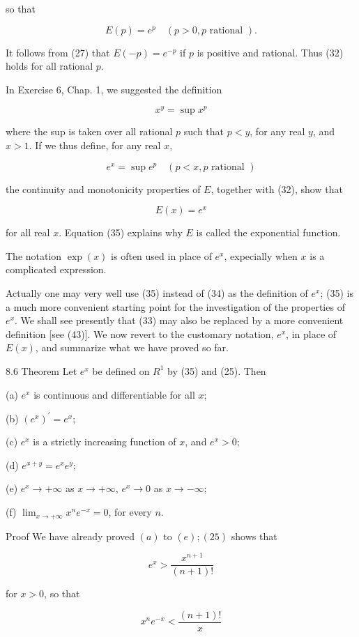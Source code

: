 \documentclass[10pt]{article}
\begin{document}
so that

$$
E(p)=e^{p} \quad(p>0, p \text { rational }) .
$$

It follows from (27) that $E(-p)=e^{-p}$ if $p$ is positive and rational. Thus (32) holds for all rational $p$.

In Exercise 6, Chap. 1, we suggested the definition

$$
x^{y}=\sup x^{p}
$$

where the sup is taken over all rational $p$ such that $p<y$, for any real $y$, and $x>1$. If we thus define, for any real $x$,

$$
e^{x}=\sup e^{p} \quad(p<x, p \text { rational })
$$

the continuity and monotonicity properties of $E$, together with (32), show that

$$
E(x)=e^{x}
$$

for all real $x$. Equation (35) explains why $E$ is called the exponential function.

The notation $\exp (x)$ is often used in place of $e^{x}$, expecially when $x$ is a complicated expression.

Actually one may very well use (35) instead of (34) as the definition of $e^{x}$; (35) is a much more convenient starting point for the investigation of the properties of $e^{x}$. We shall see presently that (33) may also be replaced by a more convenient definition [see (43)]. We now revert to the customary notation, $e^{x}$, in place of $E(x)$, and summarize what we have proved so far.

8.6 Theorem Let $e^{x}$ be defined on $R^{1}$ by (35) and (25). Then

(a) $e^{x}$ is continuous and differentiable for all $x$;

(b) $\left(e^{x}\right)^{\prime}=e^{x}$;

(c) $e^{x}$ is a strictly increasing function of $x$, and $e^{x}>0$;

(d) $e^{x+y}=e^{x} e^{y}$;

(e) $e^{x} \rightarrow+\infty$ as $x \rightarrow+\infty$, $e^{x} \rightarrow 0$ as $x \rightarrow-\infty$;

(f) $\lim _{x \rightarrow+\infty} x^{n} e^{-x}=0$, for every $n$.

Proof We have already proved $(a)$ to $(e) ;(25)$ shows that

$$
e^{x}>\frac{x^{n+1}}{(n+1) !}
$$

for $x>0$, so that

$$
x^{n} e^{-x}<\frac{(n+1) !}{x}
$$
\end{document}
